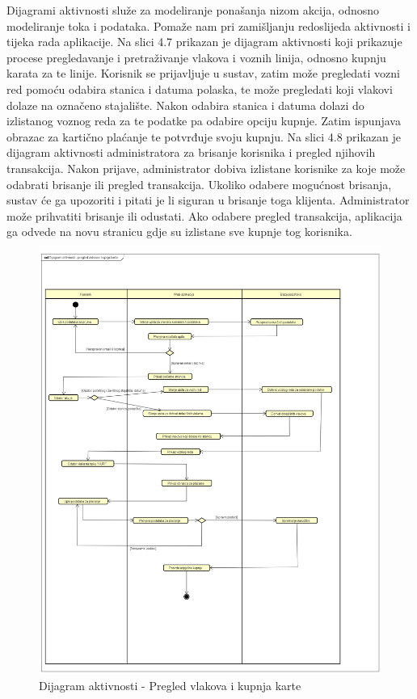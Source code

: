 			{Dijagrami aktivnosti služe za modeliranje ponašanja nizom akcija, odnosno modeliranje toka i podataka. Pomaže nam pri zamišljanju redoslijeda aktivnosti i tijeka rada aplikacije. Na slici 4.7 prikazan je dijagram aktivnosti koji prikazuje procese pregledavanje i pretraživanje vlakova i voznih linija, odnosno kupnju karata za te linije. Korisnik se prijavljuje u sustav, zatim može pregledati vozni red pomoću odabira stanica i datuma polaska, te može pregledati koji vlakovi dolaze na označeno stajalište. Nakon odabira stanica i datuma dolazi do izlistanog voznog reda za te podatke pa odabire opciju kupnje. Zatim ispunjava obrazac za kartično plaćanje te potvrđuje svoju kupnju. Na slici 4.8 prikazan je dijagram aktivnosti administratora za brisanje korisnika i pregled njihovih transakcija. Nakon prijave, administrator dobiva izlistane korisnike za koje može odabrati brisanje ili pregled transakcija. Ukoliko odabere mogućnost brisanja, sustav će ga upozoriti i pitati je li siguran u brisanje toga klijenta. Administrator može prihvatiti brisanje ili odustati. Ako odabere pregled transakcija, aplikacija ga odvede na novu stranicu gdje su izlistane sve kupnje tog korisnika. }
			
				\begin{figure}[H]
					\centering
					\includegraphics[width=1\linewidth]{"slike/actDiagram1.png"}
					\caption{Dijagram aktivnosti - Pregled vlakova i kupnja karte}
					\label{fig:dij-akt-prvi}
				\end{figure}
			
